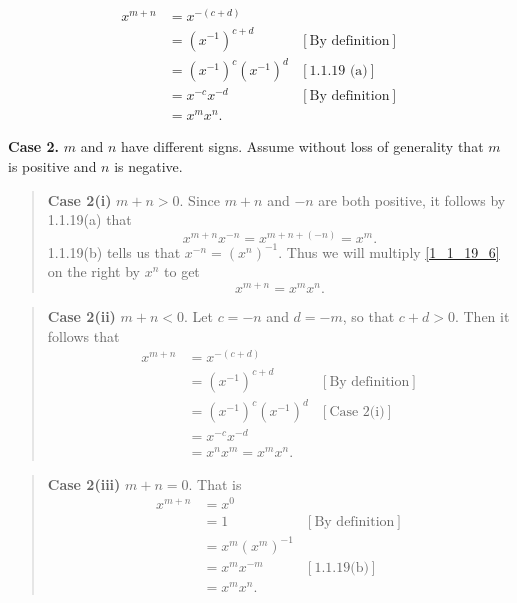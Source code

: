 \documentclass[9pt]{article}
\begin{document}
\begin{enumerate}
\begin{enumerate}
               \begin{align*}
                  x^{m+n} &= x^{-(c+d)} \\
                     &= (x^{-1})^{c+d} &[\text{By definition}] \\
                     &= (x^{-1})^c(x^{-1})^d &[\text{1.1.19 (a)}] \\
                     &= x^{-c}x^{-d} &[\text{By definition}] \\
                     &= x^mx^n.
               \end{align*}
               
               \textbf{Case 2.} $m$ and $n$ have different signs. Assume without
               loss of generality that $m$ is positive and $n$ is negative.
               \begin{quote}
               \textbf{Case 2(i)} $m + n > 0$. Since $m+n$ and $-n$ are both
               positive, it follows by 1.1.19(a) that
               \begin{equation} \label{1_1_19_6}
                  x^{m+n}x^{-n} = x^{m+n+(-n)} = x^m.
               \end{equation}
               1.1.19(b) tells us that $x^{-n} = (x^n)^{-1}$. Thus we will
               multiply \eqref{1_1_19_6} on the right by $x^n$ to get
               $$x^{m+n} = x^mx^n.$$
               \end{quote}
               
               \begin{quote}               
               \textbf{Case 2(ii)} $m + n < 0$. Let $c = -n$ and $d = -m$, so
               that $c + d > 0$. Then it follows that
               \begin{align*}
                  x^{m+n} &= x^{-(c+d)} \\
                     &= (x^{-1})^{c+d} &[\text{By definition}] \\
                     &= (x^{-1})^c(x^{-1})^d &[\text{Case 2(i)}]\\
                     &= x^{-c}x^{-d} \\
                     &= x^nx^m = x^mx^n.
               \end{align*}
               \end{quote}
               
               \begin{quote}               
               \textbf{Case 2(iii)} $m + n = 0$. That is
               \begin{align*}
                  x^{m+n} &= x^0 \\
                     &= 1 &[\text{By definition}] \\
                     &= x^m(x^m)^{-1} \\
                     &= x^mx^{-m} &[\text{1.1.19(b)}] \\
                     &= x^mx^n.
               \end{align*}
               \end{quote}
         

\end{enumerate}
\end{enumerate}
\end{document}
